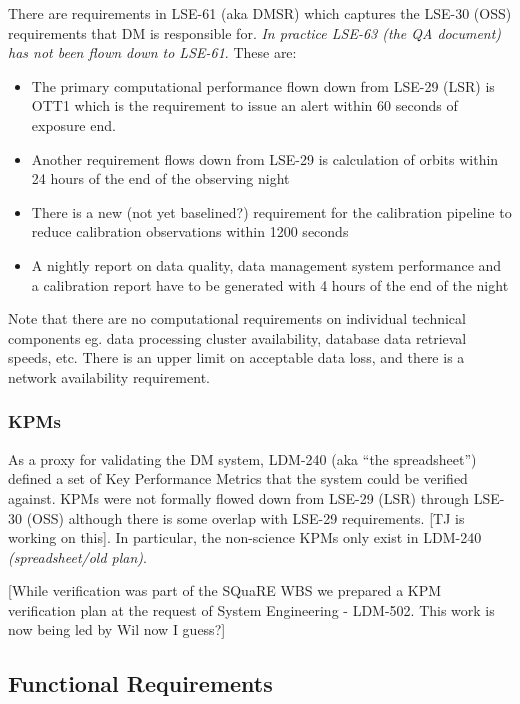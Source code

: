 There are requirements in LSE-61 (aka DMSR) which captures the LSE-30 (OSS) requirements that DM is responsible for. \textit{In practice LSE-63 (the QA document) has not been flown down to LSE-61}. These are:

\begin{itemize}

\item The primary computational performance flown down from LSE-29 (LSR) is OTT1 which is the requirement to issue an alert within 60 seconds of exposure end.

\item Another requirement flows down from LSE-29 is calculation of orbits within 24 hours of the end of the observing night

\item There is a new (not yet baselined?) requirement for the calibration pipeline to reduce calibration observations within 1200 seconds

\item A nightly report on data quality, data management system performance and a calibration report have to be generated with 4 hours of the end of the night 

\end{itemize}

Note that there are no computational requirements on individual technical components eg. data processing cluster availability, database data retrieval speeds, etc. There is an upper limit on acceptable data loss, and there is a network availability requirement. 

\subsubsection{KPMs}


As a proxy for validating the DM system, LDM-240 (aka “the spreadsheet”) defined a set of Key Performance Metrics that the system could be verified against. KPMs were not formally flowed down from LSE-29 (LSR) through LSE-30 (OSS) although there is some overlap with LSE-29 requirements. [TJ is working on this]. In particular, the non-science KPMs only exist in LDM-240 \textit{(spreadsheet/old plan)}.

[While verification was part of the SQuaRE WBS we prepared a KPM verification plan at the request of System Engineering - LDM-502. This work is now being led by Wil now I guess?]

\subsection{Functional Requirements}

